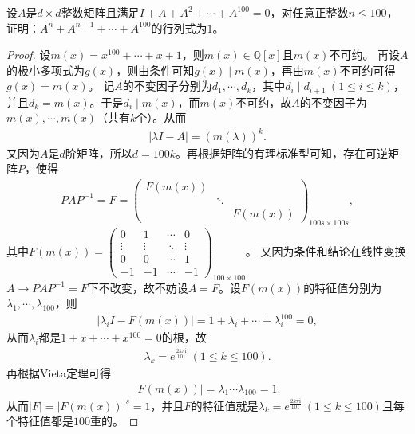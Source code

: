 \documentclass[../../main.tex]{subfiles}%
\begin{document}
\begin{example}
设$A$是$d\times d$整数矩阵且满足$I + A + A^2 + \cdots + A^{100} = 0$，对任意正整数$n \leqslant  100$，证明：$A^n + A^{n + 1} + \cdots + A^{100}$的行列式为$1$。 
\end{example}
\begin{proof}

设$m(x) = x^{100}+\cdots + x + 1$，则$m(x)\in \mathbb{Q}[x]$且$m(x)$不可约。
再设$A$的极小多项式为$g(x)$，则由条件可知$g(x)\mid m(x)$，再由$m(x)$不可约可得$g(x)=m(x)$。
记$A$的不变因子分别为$d_1,\cdots,d_k$，其中$d_i\mid d_{i + 1}\ (1\leqslant i\leqslant k)$，并且$d_k = m(x)$。于是$d_i\mid m(x)$，而$m(x)$不可约，故$A$的不变因子为$m(x),\cdots,m(x)$（共有$k$个）。从而
\begin{align*}
|\lambda I - A| = (m(\lambda))^k.
\end{align*}
又因为$A$是$d$阶矩阵，所以$d = 100k$。再根据矩阵的有理标准型可知，存在可逆矩阵$P$，使得
\begin{align*}
PAP^{-1} = F = \begin{pmatrix}
F(m(x)) & & \\
& \ddots & \\
& & F(m(x))
\end{pmatrix}_{100s\times 100s},
\end{align*}
其中$F(m(x)) = \begin{pmatrix}
0 & 1 & \cdots & 0 \\
\vdots & \vdots & \ddots & \vdots \\
0 & 0 & \cdots & 1 \\
-1 & -1 & \cdots & -1
\end{pmatrix}_{100\times 100}$。
又因为条件和结论在线性变换$A\rightarrow PAP^{-1}=F$下不改变，故不妨设$A = F$。设$F(m(x))$的特征值分别为$\lambda_1,\cdots,\lambda_{100}$，则
\begin{align*}
|\lambda_i I - F(m(x))| = 1 + \lambda_i + \cdots + \lambda_i^{100} = 0,
\end{align*}
从而$\lambda_i$都是$1 + x + \cdots + x^{100} = 0$的根，故
\begin{align}
\lambda_k = e^{\frac{2k\pi \mathrm{i}}{101}}\ (1\leqslant k\leqslant 100). \label{100.50}
\end{align}
再根据Vieta定理可得
\begin{align*}
|F(m(x))| = \lambda_1\cdots \lambda_{100} = 1.
\end{align*}
从而$|F| = |F(m(x))|^s = 1$，并且$F$的特征值就是$\lambda_k = e^{\frac{2k\pi \mathrm{i}}{101}}\ (1\leqslant k\leqslant 100)$且每个特征值都是$100$重的。


\end{proof}
\end{document}
